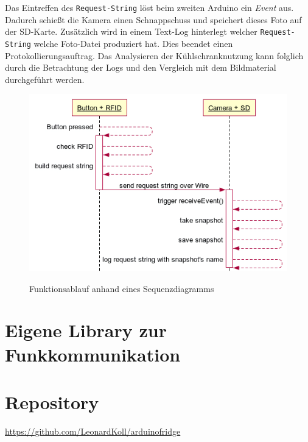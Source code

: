 \documentclass[a4paper, 11pt]{article}
\begin{document}
\noindent Das Eintreffen des \texttt{Request-String} löst beim zweiten Arduino ein \textit{Event} aus. Dadurch schießt die Kamera einen Schnappschuss und speichert dieses Foto auf der SD-Karte. Zusätzlich wird in einem Text-Log hinterlegt welcher \texttt{Request-String} welche Foto-Datei produziert hat. Dies beendet einen Protokollierungsauftrag. Das Analysieren der Kühlschranknutzung kann folglich durch die Betrachtung der Logs und den Vergleich mit dem Bildmaterial durchgeführt werden. 

\begin{figure}[htb]
\centering
    {\includegraphics[width=.9\textwidth]{sequenz1.png}}
    \caption{Funktionsablauf anhand eines Sequenzdiagramms\label{fig:sequenz}}
\centering
\end{figure}


\section{Eigene Library zur Funkkommunikation}



\section{Repository}
\url{https://github.com/LeonardKoll/arduinofridge}
\end{document}

